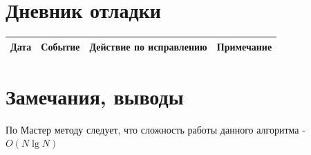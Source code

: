 \documentclass[12pt]{article}
\begin{document}
%

\section{Дневник отладки}
\begin{tabular}{|c|c|c|c|}
\hline
Дата & Событие & Действие по исправлению & Примечание \\
\hline
\end{tabular}

\section{Замечания, выводы}
По Мастер методу следует, что сложность работы данного алгоритма - $O(N\lg{N})$
\end{document}

